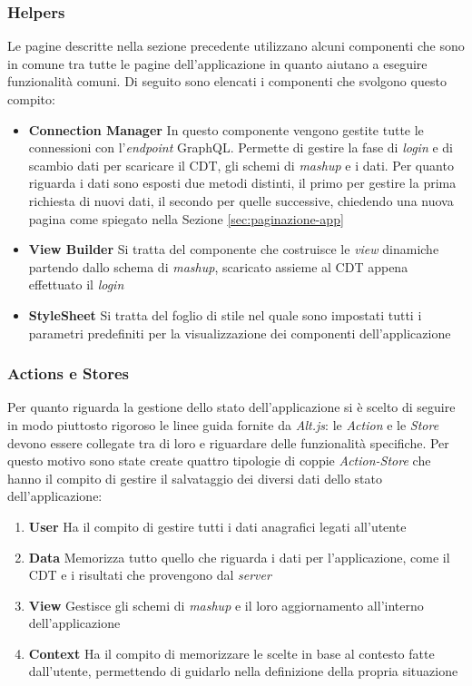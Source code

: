 \subsubsection{Helpers}

Le pagine descritte nella sezione precedente utilizzano alcuni componenti che sono in comune tra tutte le pagine dell'applicazione in quanto aiutano a eseguire funzionalità comuni. Di seguito sono elencati i componenti che svolgono questo compito:

\begin{itemize}
	\item \textbf{Connection Manager}
	In questo componente vengono gestite tutte le connessioni con l'\emph{endpoint} GraphQL. Permette di gestire la fase di \emph{login} e di scambio dati per scaricare il CDT, gli schemi di \emph{mashup} e i dati. Per quanto riguarda i dati sono esposti due metodi distinti, il primo per gestire la prima richiesta di nuovi dati, il secondo per quelle successive, chiedendo una nuova pagina come spiegato nella Sezione \ref{sec:paginazione-app}
	\item \textbf{View Builder}
	Si tratta del componente che costruisce le \emph{view} dinamiche partendo dallo schema di \emph{mashup}, scaricato assieme al CDT appena effettuato il \emph{login}	
	\item \textbf{StyleSheet}
	Si tratta del foglio di stile nel quale sono impostati tutti i parametri predefiniti per la visualizzazione dei componenti dell'applicazione
\end{itemize}

\subsubsection{Actions e Stores\label{sec:action-store}}
Per quanto riguarda la gestione dello stato dell'applicazione si è scelto di seguire in modo piuttosto rigoroso le linee guida fornite da \emph{Alt.js}: le \emph{Action} e le \emph{Store} devono essere collegate tra di loro e riguardare delle funzionalità specifiche.
Per questo motivo sono state create quattro tipologie di coppie \emph{Action-Store} che hanno il compito di gestire il salvataggio dei diversi dati dello stato dell'applicazione: 
\begin{enumerate}
	\item \textbf{User} Ha il compito di gestire tutti i dati anagrafici legati all'utente
	\item \textbf{Data} Memorizza tutto quello che riguarda i dati per l'applicazione, come il CDT e i risultati che provengono dal \emph{server}
	\item \textbf{View} Gestisce gli schemi di \emph{mashup} e il loro aggiornamento all'interno dell'ap\-pli\-ca\-zio\-ne
	\item \textbf{Context} Ha il compito di memorizzare le scelte in base al contesto fatte dall'utente, permettendo di guidarlo nella definizione della propria situazione
\end{enumerate}

